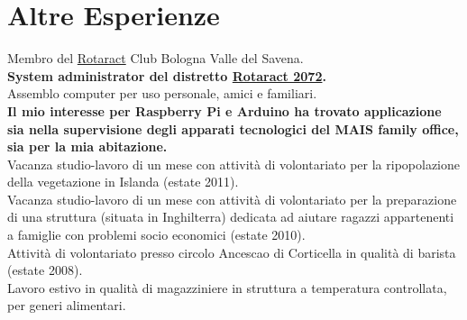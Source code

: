 \documentclass[%
               doublesided,
               paper=a4,
               fontsize=10pt
              ]{Rubini-Mattia-resume}
\begin{document}

    

    
    



\pagestyle{empty}

    \section{Altre Esperienze}
        Membro del \href{https://en.wikipedia.org/wiki/Rotaract}{Rotaract} Club Bologna Valle del Savena.
        \\\textbf{System administrator del distretto \href{https://rotaract2072.com/}{Rotaract 2072}.}
        \\Assemblo computer per uso personale, amici e familiari.
        \\ \textbf{Il mio interesse per Raspberry Pi e Arduino ha trovato applicazione sia nella supervisione degli apparati tecnologici del MAIS family office, sia per la mia abitazione.}
        \\Vacanza studio-lavoro di un mese con attività di volontariato per la ripopolazione della vegetazione in Islanda (estate 2011).
        \\Vacanza studio-lavoro di un mese con attività di volontariato per la preparazione di una struttura (situata in Inghilterra) dedicata ad aiutare ragazzi appartenenti a famiglie con problemi socio economici (estate 2010).
        \\Attività di volontariato presso circolo Ancescao di Corticella in qualità di barista (estate 2008).
        \\Lavoro estivo in qualità di magazziniere in struttura a temperatura controllata, per generi alimentari.
\end{document}
